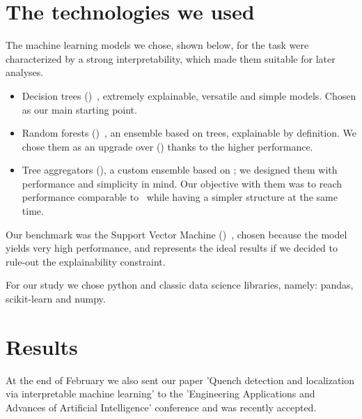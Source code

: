 \documentclass[a4paper, notitlepage]{article}
\begin{document}
\section{The technologies we used}
The machine learning models we chose, shown below, for the task were characterized by a strong
interpretability, which made them suitable for later analyses.
\begin{itemize}
	\item Decision trees (\dts)~\cite{breiman1984-dt}, extremely explainable, versatile and
	      simple models. Chosen as our main starting point.
	\item Random forests (\rfs)~\cite{breiman2001-rf}, an ensemble based on trees, explainable
	      by definition. We chose them as an upgrade over (\dts) thanks to the higher
	      performance.
	\item Tree aggregators (\tas), a custom ensemble based on \dts; we designed them with
	      performance and simplicity in mind. Our objective with them was to reach performance
	      comparable to \rfs\ while having a simpler structure at the same time.
\end{itemize}
Our benchmark was the Support Vector Machine (\svm)~\cite{cortes1995-svm}, chosen because the model
yields very high performance, and represents the ideal results if we decided to rule-out the explainability constraint.

For our study we chose python and classic data science libraries, namely: pandas,
scikit-learn and numpy.

\section{Results}
At the end of February we also sent our paper 'Quench detection and localization via
interpretable machine learning' to the 'Engineering Applications and Advances of Artificial
Intelligence' conference and was recently accepted.

\medskip
\end{document}
